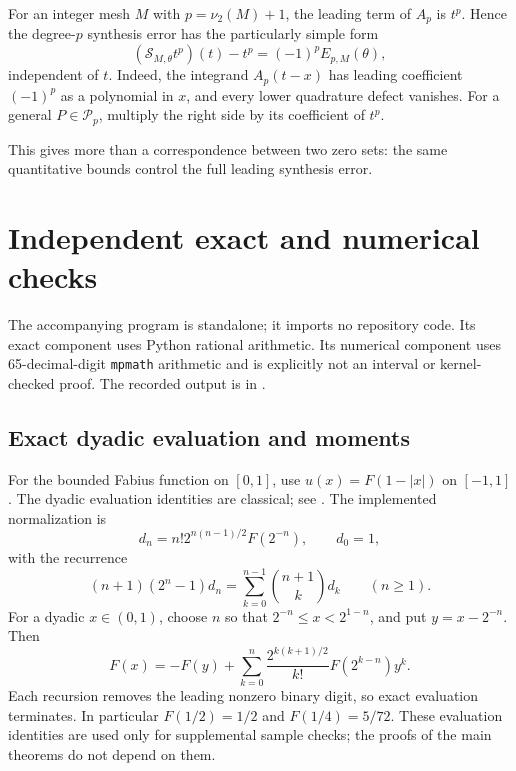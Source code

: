 \documentclass[11pt,a4paper]{article}
\numberwithin{equation}{section}
\theoremstyle{plain}
\theoremstyle{definition}
\theoremstyle{remark}
\newcommand{\Poly}{\mathcal P}
\newcommand{\code}[1]{\texttt{\small #1}}
\begin{document}
For an integer mesh $M$ with $p=\nu_2(M)+1$, the leading term of $A_p$
is $t^p$. Hence the degree-$p$ synthesis error has the particularly simple
form
\begin{equation}\label{eq:synthesis-leading-error}
 (\mathcal S_{M,\theta}t^p)(t)-t^p=(-1)^pE_{p,M}(\theta),
\end{equation}
independent of $t$. Indeed, the integrand $A_p(t-x)$ has leading
coefficient $(-1)^p$ as a polynomial in $x$, and every lower quadrature
defect vanishes. For a general $P\in\Poly_p$, multiply the right side
by its coefficient of $t^p$.

This gives more than a correspondence between two zero sets: the same
quantitative bounds control the full leading synthesis error.

\section{Independent exact and numerical checks}
\label{sec:checks}

The accompanying program  is standalone;
it imports no repository code. Its exact component uses Python rational
arithmetic. Its numerical component uses 65-decimal-digit \code{mpmath}
arithmetic and is explicitly not an interval or kernel-checked proof.
The recorded output is in .

\subsection{Exact dyadic evaluation and moments}

For the bounded Fabius function on $[0,1]$, use
$u(x)=F(1-|x|)$ on $[-1,1]$. The dyadic evaluation identities are
classical; see \cite[eqs.~(19), (22), and Prop.~10]{arias2017}. The implemented normalization is
\begin{equation}\label{eq:dn}
 d_n=n!2^{n(n-1)/2}F(2^{-n}),\qquad d_0=1,
\end{equation}
with the recurrence
\begin{equation}\label{eq:drec}
 (n+1)(2^n-1)d_n=\sum_{k=0}^{n-1}\binom{n+1}{k}d_k
 \qquad(n\ge1).
\end{equation}
For a dyadic $x\in(0,1)$, choose $n$ so that
$2^{-n}\le x<2^{1-n}$, and put $y=x-2^{-n}$. Then
\begin{equation}\label{eq:Frec}
 F(x)=-F(y)+\sum_{k=0}^n
 \frac{2^{k(k+1)/2}}{k!}F(2^{k-n})y^k.
\end{equation}
Each recursion removes the leading nonzero binary digit, so exact
evaluation terminates. In particular $F(1/2)=1/2$ and $F(1/4)=5/72$.
These evaluation identities are used only for supplemental sample checks;
the proofs of the main theorems do not depend on them.
\end{document}
